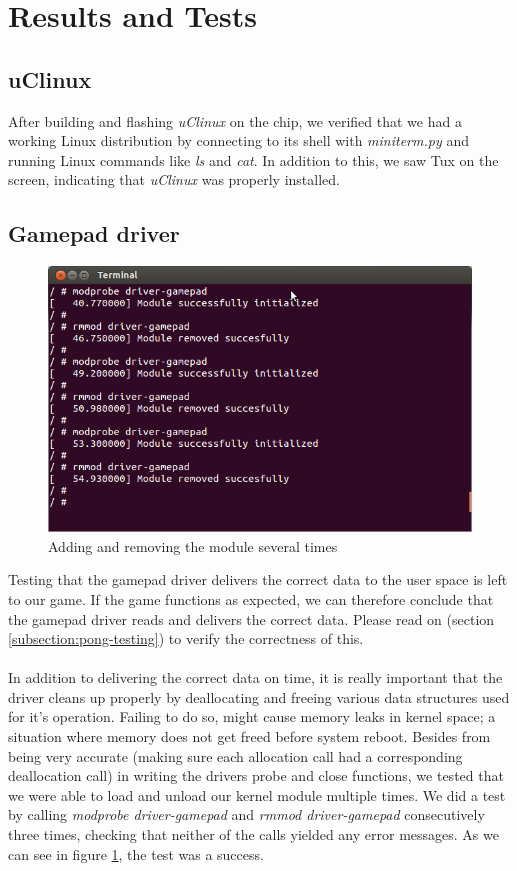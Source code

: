 \section{Results and Tests}


\subsection{uClinux}
After building and flashing \emph{uClinux} on the chip, we verified that we had a working Linux distribution by connecting to its shell with \emph{miniterm.py} and running Linux commands like \emph{ls} and \emph{cat}. In addition to this, we saw Tux on the screen, indicating that \emph{uClinux} was properly installed.

\subsection{Gamepad driver}
\begin{figure}[h]
	\centering
	\includegraphics[width=12cm]{img/modprobe.png}
	\caption{Adding and removing the module several times}
	\label{fig:modprobe}
\end{figure}
Testing that the gamepad driver delivers the correct data to the user space is left to our game. If the game functions as expected, we can therefore conclude that the gamepad driver reads and delivers the correct data. Please read on (section \ref{subsection:pong-testing}) to verify the correctness of this.\\
\\
In addition to delivering the correct data on time, it is really important that the driver cleans up properly by deallocating and freeing various data structures used for it's operation. Failing to do so, might cause memory leaks in kernel space; a situation where memory does not get freed before system reboot. Besides from being very accurate (making sure each allocation call had a corresponding deallocation call) in writing the drivers probe and close functions, we tested that we were able to load and unload our kernel module multiple times. We did a test by calling \emph{modprobe driver-gamepad} and \emph{rmmod driver-gamepad} consecutively three times, checking that neither of the calls yielded any error messages. As we can see in figure \ref{fig:modprobe}, the test was a success.

